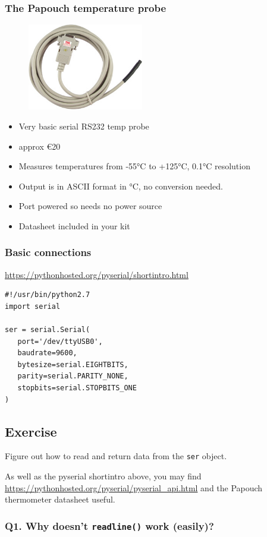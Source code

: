 \documentclass[aspectratio=1610,9pt]{beamer} %
\begin{document}
\begin{frame}
\frametitle{The Papouch temperature probe}

\begin{figure}
\vspace{-3cm}
\includegraphics[width=0.45\textwidth]{papouchprobe.jpeg}
\end{figure}
\par
\begin{minipage}{0.45\textwidth}
\begin{itemize}
\itemsep1pt\parskip0pt
\item
  Very basic serial RS232 temp probe
\item
  approx €20
\item
  Measures temperatures from -55°C to +125°C, 0.1°C resolution
\item
  Output is in ASCII format in °C, no conversion needed.
\item
  Port powered so needs no power source
\item
  Datasheet included in your kit
\end{itemize}
\end{minipage}

\end{frame}
\begin{frame}[fragile=singleslide]
\frametitle{Basic connections}

\href{https://pythonhosted.org/pyserial/shortintro.html}{https://pythonhosted.org/pyserial/shortintro.html}

\begin{verbatim}
#!/usr/bin/python2.7
import serial

ser = serial.Serial(
   port='/dev/ttyUSB0',
   baudrate=9600,
   bytesize=serial.EIGHTBITS,
   parity=serial.PARITY_NONE,
   stopbits=serial.STOPBITS_ONE
)
\end{verbatim}

\subsection{Exercise}

Figure out how to read and return data from the \texttt{ser} object.

As well as the pyserial shortintro above, you may find
\url{https://pythonhosted.org/pyserial/pyserial_api.html}
and the Papouch thermometer datasheet useful.

\subsubsection{Q1. Why doesn't \texttt{readline()} work (easily)?}

\end{frame}
\end{document}
